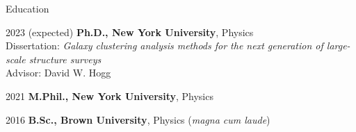 \begin{cvlist}{Education}
\item[2023 (expected)] \textbf{Ph.D., New York University}, Physics \\
Dissertation: \emph{Galaxy clustering analysis methods for the next generation of large-scale structure surveys} \\
Advisor: David W. Hogg
\item[2021] \textbf{M.Phil., New York University}, Physics
\item[2016] \textbf{B.Sc., Brown University}, Physics (\emph{magna cum laude})
\end{cvlist}